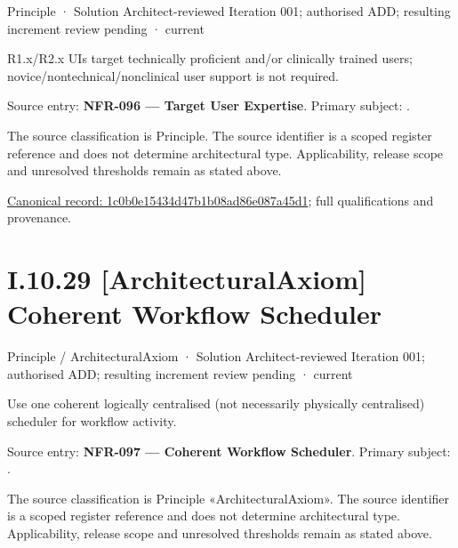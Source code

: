 \label{element:1c0b0e15434d47b1b08ad86e087a45d1}
{\small Principle · Solution Architect-reviewed Iteration 001; authorised ADD; resulting increment review pending · current}\par

R1.x/R2.x UIs target technically proficient and/or clinically trained users; novice/nontechnical/nonclinical user support is not required.



Source entry: \textbf{NFR-096 — Target User Expertise}. Primary subject: \texttt{}.



The source classification is Principle. The source identifier is a scoped register reference and does not determine architectural type. Applicability, release scope and unresolved thresholds remain as stated above.


{\footnotesize \href{../../../../continuum/motivation/principle/1c0b0e15434d47b1b08ad86e087a45d1.md}{Canonical record: 1c0b0e15434d47b1b08ad86e087a45d1}; full qualifications and provenance.}\par
\section*{I.10.29 [ArchitecturalAxiom] Coherent Workflow Scheduler}
\label{navigation:I.10.29}

\label{element:99adfc9b5af049748df91755d395c247}
{\small Principle / ArchitecturalAxiom · Solution Architect-reviewed Iteration 001; authorised ADD; resulting increment review pending · current}\par

Use one coherent logically centralised (not necessarily physically centralised) scheduler for workflow activity.



Source entry: \textbf{NFR-097 — Coherent Workflow Scheduler}. Primary subject: \texttt{}.



The source classification is Principle «ArchitecturalAxiom». The source identifier is a scoped register reference and does not determine architectural type. Applicability, release scope and unresolved thresholds remain as stated above.



